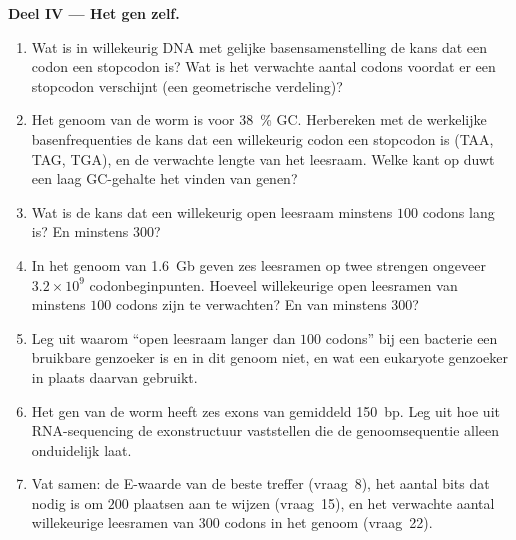 \begin{problem}
\medskip
\noindent\textbf{Deel IV --- Het gen zelf.}
\begin{enumerate}[resume]
  \item Wat is in willekeurig DNA met gelijke basensamenstelling de
        kans dat een codon een stopcodon is? Wat is het verwachte
        aantal codons voordat er een stopcodon verschijnt (een
        geometrische verdeling)?
  \item Het genoom van de worm is voor \qty{38}{\%} GC. Herbereken met
        de werkelijke basenfrequenties de kans dat een willekeurig
        codon een stopcodon is (TAA, TAG, TGA), en de verwachte lengte
        van het leesraam. Welke kant op duwt een laag GC-gehalte het
        vinden van genen?
  \item Wat is de kans dat een willekeurig open leesraam minstens $100$
        codons lang is? En minstens $300$?
  \item In het genoom van \qty{1.6}{Gb} geven zes leesramen op twee
        strengen ongeveer $3.2\times 10^{9}$ codonbeginpunten. Hoeveel
        willekeurige open leesramen van minstens $100$ codons zijn te
        verwachten? En van minstens $300$?
  \item Leg uit waarom ``open leesraam langer dan $100$ codons'' bij een
        bacterie een bruikbare genzoeker is en in dit genoom niet, en
        wat een eukaryote genzoeker in plaats daarvan gebruikt.
  \item Het gen van de worm heeft zes exons van gemiddeld \qty{150}{bp}.
        Leg uit hoe  uit RNA-sequencing de exonstructuur
        vaststellen die de genoomsequentie alleen onduidelijk laat.
  \item Vat samen: de E-waarde van de beste treffer (vraag~8), het
        aantal bits dat nodig is om $200$ plaatsen aan te wijzen
        (vraag~15), en het verwachte aantal willekeurige leesramen van
        $300$ codons in het genoom (vraag~22).
\end{enumerate}
\end{problem}
